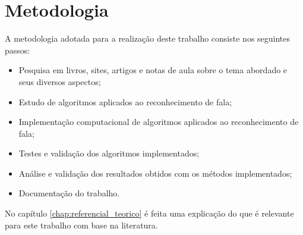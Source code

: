 \section{Metodologia}

\quad A metodologia adotada para a realização deste trabalho consiste nos seguintes passos:

\begin{itemize}
\item Pesquisa em livros, sites, artigos e notas de aula sobre o tema abordado e seus diversos aspectos;
\item Estudo de algoritmos aplicados ao reconhecimento de fala;
\item Implementação computacional de algoritmos aplicados ao reconhecimento de fala;
\item Testes e validação dos algoritmos implementados;
\item Análise e validação dos resultados obtidos com os métodos implementados;
\item Documentação do trabalho. 

\end{itemize}

\quad No capítulo \ref{chap:referencial_teorico} é feita uma explicação do que é relevante para este trabalho com base na literatura.

























